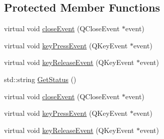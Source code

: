 \subsection*{Protected Member Functions}
\begin{DoxyCompactItemize}
\item 
virtual void \hyperlink{classsaw_a_t_i_net_f_t_simulator_qt_widget_a3a35f59ad90296477b00d5e067b43859}{close\-Event} (Q\-Close\-Event $\ast$event)
\item 
virtual void \hyperlink{classsaw_a_t_i_net_f_t_simulator_qt_widget_af1b9898bc114f446f255d461bfda0e43}{key\-Press\-Event} (Q\-Key\-Event $\ast$event)
\item 
virtual void \hyperlink{classsaw_a_t_i_net_f_t_simulator_qt_widget_a14aa5220351846d9fc2e52a5978c0ca6}{key\-Release\-Event} (Q\-Key\-Event $\ast$event)
\item 
std\-::string \hyperlink{classsaw_a_t_i_net_f_t_simulator_qt_widget_ac2c693bdb457d7042b35004e03d9bbc0}{Get\-Status} ()
\item 
virtual void \hyperlink{classsaw_a_t_i_net_f_t_simulator_qt_widget_a3a35f59ad90296477b00d5e067b43859}{close\-Event} (Q\-Close\-Event $\ast$event)
\item 
virtual void \hyperlink{classsaw_a_t_i_net_f_t_simulator_qt_widget_af1b9898bc114f446f255d461bfda0e43}{key\-Press\-Event} (Q\-Key\-Event $\ast$event)
\item 
virtual void \hyperlink{classsaw_a_t_i_net_f_t_simulator_qt_widget_a14aa5220351846d9fc2e52a5978c0ca6}{key\-Release\-Event} (Q\-Key\-Event $\ast$event)
\end{DoxyCompactItemize}
